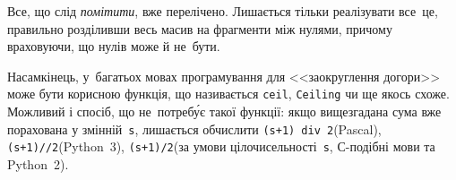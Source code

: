 Все, що слід \emph{помітити}, вже перелічено. Лишається тільки реалізувати все~це, правильно розділивши весь масив на фрагменти між нулями, причому враховуючи, що нулів може й не~бути. 

Насамкінець, у~багатьох мовах програмування для <<заокруглення догори>> може бути корисною функція, що називається \verb"ceil", \verb"Ceiling" чи ще якось схоже. 
Можливий і спосіб, що не~потреб\'{у}є такої функції: 
якщо вищезгадана сума вже порахована у змінній~\texttt{s}, лишається обчислити
\verb"(s+1) div 2"\nolinebreak[2] (Pascal),
\verb"(s+1)//2"\nolinebreak[2] (Python~3),
\verb"(s+1)/2"\nolinebreak[2] (за умови цілочисельності~\texttt{s}, С-подібні мови та Python~2).
